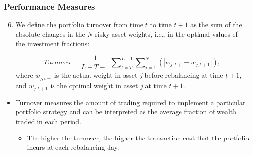 \documentclass[pdf,10pt,xcolor=dvipsnames,hide notes]{beamer}
\begin{document}
\begin{frame}
	\frametitle{Performance Measures}
	
	\begin{enumerate}
		\setcounter{enumi}{5}
		
		\item We define the portfolio turnover from time $t$ to time $t+1$ as the sum of
		the absolute changes in the $N$ risky asset weights, i.e., in the optimal
		values of the investment fractions:
		
		\begin{equation}
		Turnover=\frac{1}{L-T-1}\sum\nolimits_{t=T}^{L-1}\sum\nolimits_{j=1}^{N}%
		\left( \left\vert w_{j,t+}-w_{j,t+1}\right\vert \right) ,
		\end{equation}%
		where $w_{j,t+}^{{}}$ is the actual weight in asset $j$ before rebalancing
		at time $t+1$, and $w_{j,t+1}$ is the optimal weight in asset $j$ at time $%
		t+1$. 
		
		
			\end{enumerate}
		
		\vspace{0.3cm}
		
		\begin{itemize}
		
			\item Turnover measures the amount of trading required to implement a
		particular portfolio strategy and can be interpreted as the average fraction
		of wealth traded in each period.
		\vspace{0.3cm}
		
		\begin{itemize} \item The higher the turnover, the higher
		the transaction cost that the portfolio incurs at each rebalancing day.
		\end{itemize}
		
		\end{itemize}
		
		
\end{frame}
\end{document}
